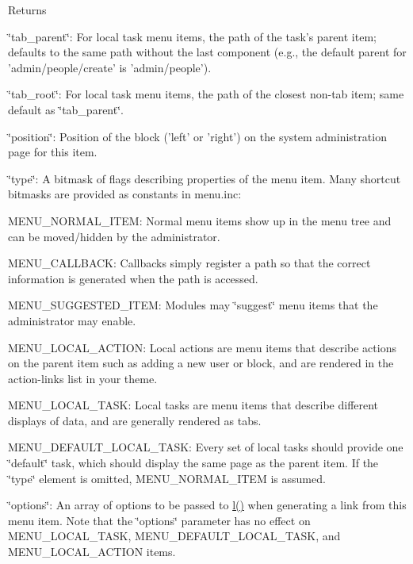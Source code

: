 \begin{DoxyReturn}{Returns}
\begin{DoxyItemize}
\begin{DoxyItemize}
\end{DoxyItemize}
\item \char`\"{}tab\_\-parent\char`\"{}: For local task menu items, the path of the task's parent item; defaults to the same path without the last component (e.g., the default parent for 'admin/people/create' is 'admin/people').
\item \char`\"{}tab\_\-root\char`\"{}: For local task menu items, the path of the closest non-\/tab item; same default as \char`\"{}tab\_\-parent\char`\"{}.
\item \char`\"{}position\char`\"{}: Position of the block ('left' or 'right') on the system administration page for this item.
\item \char`\"{}type\char`\"{}: A bitmask of flags describing properties of the menu item. Many shortcut bitmasks are provided as constants in menu.inc:
\begin{DoxyItemize}
\item MENU\_\-NORMAL\_\-ITEM: Normal menu items show up in the menu tree and can be moved/hidden by the administrator.
\item MENU\_\-CALLBACK: Callbacks simply register a path so that the correct information is generated when the path is accessed.
\item MENU\_\-SUGGESTED\_\-ITEM: Modules may \char`\"{}suggest\char`\"{} menu items that the administrator may enable.
\item MENU\_\-LOCAL\_\-ACTION: Local actions are menu items that describe actions on the parent item such as adding a new user or block, and are rendered in the action-\/links list in your theme.
\item MENU\_\-LOCAL\_\-TASK: Local tasks are menu items that describe different displays of data, and are generally rendered as tabs.
\item MENU\_\-DEFAULT\_\-LOCAL\_\-TASK: Every set of local tasks should provide one \char`\"{}default\char`\"{} task, which should display the same page as the parent item. If the \char`\"{}type\char`\"{} element is omitted, MENU\_\-NORMAL\_\-ITEM is assumed.
\end{DoxyItemize}
\item \char`\"{}options\char`\"{}: An array of options to be passed to \hyperlink{common_8inc_ad3b36c06dc46250b8d22b8d0d2e7bd97}{l()} when generating a link from this menu item. Note that the \char`\"{}options\char`\"{} parameter has no effect on MENU\_\-LOCAL\_\-TASK, MENU\_\-DEFAULT\_\-LOCAL\_\-TASK, and MENU\_\-LOCAL\_\-ACTION items.
\end{DoxyItemize}
\end{DoxyReturn}
